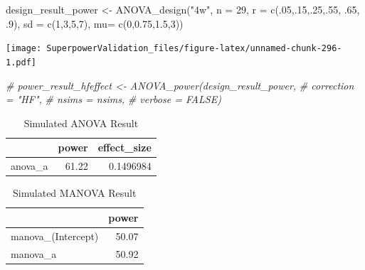 \documentclass[
]{book}
\newenvironment{Shaded}{\begin{snugshade}}{\end{snugshade}}
\newcommand{\AttributeTok}[1]{\textcolor[rgb]{0.77,0.63,0.00}{#1}}
\newcommand{\CommentTok}[1]{\textcolor[rgb]{0.56,0.35,0.01}{\textit{#1}}}
\newcommand{\DecValTok}[1]{\textcolor[rgb]{0.00,0.00,0.81}{#1}}
\newcommand{\FloatTok}[1]{\textcolor[rgb]{0.00,0.00,0.81}{#1}}
\newcommand{\FunctionTok}[1]{\textcolor[rgb]{0.00,0.00,0.00}{#1}}
\newcommand{\NormalTok}[1]{#1}
\newcommand{\OtherTok}[1]{\textcolor[rgb]{0.56,0.35,0.01}{#1}}
\newcommand{\StringTok}[1]{\textcolor[rgb]{0.31,0.60,0.02}{#1}}
\begin{document}
\begin{Shaded}
\begin{Highlighting}[]
\NormalTok{design\_result\_power }\OtherTok{\textless{}{-}} \FunctionTok{ANOVA\_design}\NormalTok{(}\StringTok{"4w"}\NormalTok{,}
                              \AttributeTok{n =} \DecValTok{29}\NormalTok{,}
                              \AttributeTok{r =} \FunctionTok{c}\NormalTok{(.}\DecValTok{05}\NormalTok{,.}\DecValTok{15}\NormalTok{,.}\DecValTok{25}\NormalTok{,.}\DecValTok{55}\NormalTok{, .}\DecValTok{65}\NormalTok{, .}\DecValTok{9}\NormalTok{),}
                              \AttributeTok{sd =} \FunctionTok{c}\NormalTok{(}\DecValTok{1}\NormalTok{,}\DecValTok{3}\NormalTok{,}\DecValTok{5}\NormalTok{,}\DecValTok{7}\NormalTok{),}
                              \AttributeTok{mu=} \FunctionTok{c}\NormalTok{(}\DecValTok{0}\NormalTok{,}\FloatTok{0.75}\NormalTok{,}\FloatTok{1.5}\NormalTok{,}\DecValTok{3}\NormalTok{))}
\end{Highlighting}
\end{Shaded}

\texttt{[image: SuperpowerValidation\_files/figure-latex/unnamed-chunk-296-1.pdf]}

\begin{Shaded}
\begin{Highlighting}[]
\CommentTok{\# power\_result\_hfeffect \textless{}{-} ANOVA\_power(design\_result\_power, }
\CommentTok{\#                                      correction = "HF",}
\CommentTok{\#                                      nsims = nsims, }
\CommentTok{\#                                      verbose = FALSE)}
\end{Highlighting}
\end{Shaded}

\begin{table}[!h]

\caption{\label{tab:unnamed-chunk-297}Simulated ANOVA Result}
\centering
\begin{tabular}[t]{l|r|r}
\hline
  & power & effect\_size\\
\hline
anova\_a & 61.22 & 0.1496984\\
\hline
\end{tabular}
\end{table}
\begin{table}[!h]

\caption{\label{tab:unnamed-chunk-298}Simulated MANOVA Result}
\centering
\begin{tabular}[t]{l|r}
\hline
  & power\\
\hline
manova\_(Intercept) & 50.07\\
\hline
manova\_a & 50.92\\
\hline
\end{tabular}
\end{table}
\end{document}
